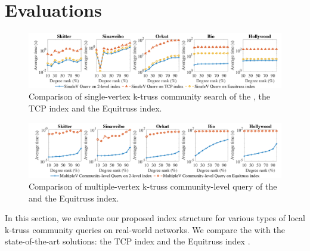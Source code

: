 \section{Evaluations}
\label{evaluation}

\begin{figure}[h]
    \centering
    \includegraphics[width=0.9\linewidth, trim={0cm 0cm, 0cm, 0.3cm}, clip]{./figures/singlev_k_compare_small.pdf}
    \caption{Comparison of single-vertex k-truss community search of the \twolevelindex{}, the TCP index and the Equitruss index.}
    \label{fig:singlev_k_compare}
		\vspace{-0.3cm}
\end{figure}

\begin{figure}[h]
    \centering
    \includegraphics[width=0.9\linewidth, trim={0cm 0cm, 0cm, 0.3cm}, clip]{./figures/multiplev_k_compare_small.pdf}
    \caption{Comparison of multiple-vertex k-truss community-level query of the \twolevelindex{} and the Equitruss index.}
    \label{fig:multiplev_k_compare}
		\vspace{-0.3cm}
\end{figure}

In this section, we evaluate our proposed index structure for various types of local k-truss community queries on real-world networks. We compare the \twolevelindex{} with the state-of-the-art solutions: the TCP index \cite{huang2014querying} and the Equitruss index \cite{akbas2017truss}. %

